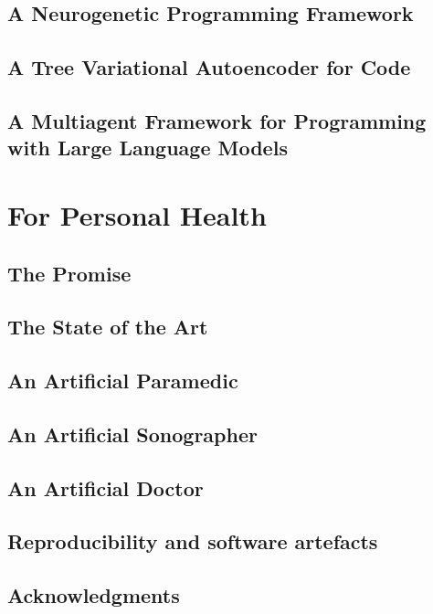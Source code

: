 \newpage
\chapter{A Neurogenetic Programming Framework}\label{ch:neurogen}


\newpage
\chapter{A Tree Variational Autoencoder for Code}\label{ch:tree2tree}


\newpage
\chapter{A Multiagent Framework for Programming with Large Language Models}\label{ch:seidr}


\part{For Personal Health}
\newpage
\chapter{The Promise} \label{ch:health-motiv}


\newpage
\chapter{The State of the Art} \label{ch:health-sota}


\newpage
\chapter{An Artificial Paramedic} \label{ch:virtu-als}



\newpage
\chapter{An Artificial Sonographer} \label{ch:imagym}


\newpage
\chapter{An Artificial Doctor} \label{ch:mimicseq}


\newpage
\chapter{Reproducibility and software artefacts}





\newpage
\chapter{Acknowledgments}



\printbibliography


